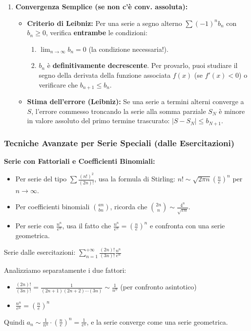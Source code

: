 \begin{enumerate}
    \item \textbf{Convergenza Semplice (se non c'è conv. assoluta):}
    \begin{itemize}
        \item \textbf{Criterio di Leibniz:} Per una serie a segno alterno $\sum (-1)^n b_n$ con $b_n \ge 0$, verifica \textbf{entrambe} le condizioni: 
        \begin{enumerate}
            \item $\lim_{n \to \infty} b_n = 0$ (la condizione necessaria!). 
            \item $b_n$ è \textbf{definitivamente decrescente}. Per provarlo, puoi studiare il segno della derivata della funzione associata $f(x)$ (se $f'(x) < 0$) o verificare che $b_{n+1} \le b_n$. 
        \end{enumerate}
        \item \textbf{Stima dell'errore (Leibniz):} Se una serie a termini alterni converge a $S$, l'errore commesso troncando la serie alla somma parziale $S_N$ è minore in valore assoluto del primo termine trascurato: $|S - S_N| \le b_{N+1}$. 
    \end{itemize}
\end{enumerate}

\subsubsection{Tecniche Avanzate per Serie Speciali (dalle Esercitazioni)}

\begin{info}
\textbf{Serie con Fattoriali e Coefficienti Binomiali:}
\begin{itemize}
    \item Per serie del tipo $\sum \frac{(n!)^2}{(2n)!}$, usa la formula di Stirling: $n! \sim \sqrt{2\pi n}\left(\frac{n}{e}\right)^n$ per $n \to \infty$.
    \item Per coefficienti binomiali $\binom{an}{bn}$, ricorda che $\binom{2n}{n} \sim \frac{4^n}{\sqrt{\pi n}}$.
    \item Per serie con $\frac{n^n}{e^n}$, usa il fatto che $\frac{n^n}{e^n} = \left(\frac{n}{e}\right)^n$ e confronta con una serie geometrica.
\end{itemize}
\end{info}

\begin{esempio}
Serie dalle esercitazioni: $\sum_{n=1}^{+\infty}\frac{(2n)!}{(3n)!}\frac{n^n}{e^n}$

Analizziamo separatamente i due fattori:
\begin{itemize}
    \item $\frac{(2n)!}{(3n)!} = \frac{1}{(2n+1)(2n+2)\cdots(3n)} \sim \frac{1}{n^n}$ (per confronto asintotico)
    \item $\frac{n^n}{e^n} = \left(\frac{n}{e}\right)^n$
\end{itemize}
Quindi $a_n \sim \frac{1}{n^n} \cdot \left(\frac{n}{e}\right)^n = \frac{1}{e^n}$, e la serie converge come una serie geometrica.
\end{esempio}

